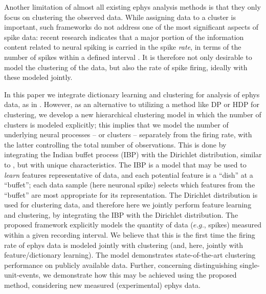 \documentclass[journal]{IEEEtran}
\begin{document}
Another limitation of almost all existing ephys analysis methods is that they only focus on clustering the observed data. While assigning data to a cluster is important, such frameworks do not address one of the most significant aspects of spike data: recent research indicates that a major portion of the  information content related to neural spiking is carried in the spike \emph{rate}, in terms of the number of spikes within a defined interval \cite{Donoghue07}. It is therefore not only desirable to model the clustering of the data, but also the rate of spike firing, ideally with these modeled jointly.

In this paper we integrate dictionary learning and clustering for analysis of ephys data, as in \cite{Dilan,Bo2011}. However, as an alternative to utilizing a method like DP or HDP \cite{Wood2009,Bo2011} for clustering, we develop a new hierarchical clustering model in which the number of clusters is modeled explicitly; this implies that we model the number of underlying neural processes -- or clusters -- separately from the firing rate, with the latter controlling the total number of observations. This is done by integrating the Indian buffet process (IBP) \cite{IBP} with the Dirichlet distribution, similar to \cite{compound}, but with unique characteristics. The IBP is a model that may be used to \emph{learn} features representative of data, and each potential feature is a ``dish'' at a ``buffet''; each data sample (here neuronal spike) selects which features from the ``buffet'' are most appropriate for its representation. The Dirichlet distribution is used for clustering data, and therefore here we jointly perform feature learning and clustering, by integrating the IBP with the Dirichlet distribution. The proposed framework explicitly models the quantity of data ($e.g.$, spikes) measured within a given recording interval. We believe that this is the first time the firing rate of ephys data is modeled jointly with clustering (and, here, jointly with feature/dictionary learning). The model demonstrates state-of-the-art clustering performance on publicly available data. Further, concerning distinguishing single-unit-events, we demonstrate how this may be achieved using the proposed method, considering new measured (experimental) ephys data.
\end{document}
